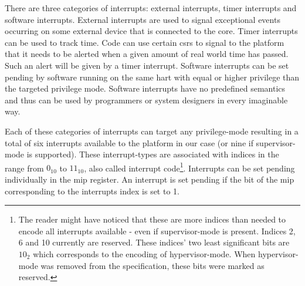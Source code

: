 There are three categories of interrupts: external interrupts, timer interrupts and software interrupts.
External interrupts are used to signal exceptional events occurring on some external device that is connected to the core.
Timer interrupts can be used to track time.
Code can use certain \glspl{csr} to signal to the platform that it needs to be alerted when a given amount of real world time has passed.
Such an alert will be given by a timer interrupt.
Software interrupts can be set pending by software running on the same \gls{hart} with equal or higher privilege than the targeted privilege mode.
Software interrupts have no predefined semantics and thus can be used by programmers or system designers in every imaginable way.

Each of these categories of interrupts can target any privilege-mode resulting in a total of six interrupts available to the platform in our case (or nine if supervisor-mode is supported).
These interrupt-types are associated with indices in the range from $ 0_{10} $ to $ 11_{10} $, also called interrupt code\footnote{%
    The reader might have noticed that these are more indices than needed to encode all interrupts available - even if supervisor-mode is present.
    Indices 2, 6 and 10 currently are reserved.
    These indices' two least significant bits are $ 10_2 $ which corresponds to the encoding of hypervisor-mode.
    When hypervisor-mode was removed from the specification, these bits were marked as reserved.
}.
Interrupts can be set pending individually in the \gls{mip} register.
An interrupt is set pending if the bit of the \gls{mip} corresponding to the interrupts index is set to 1.

